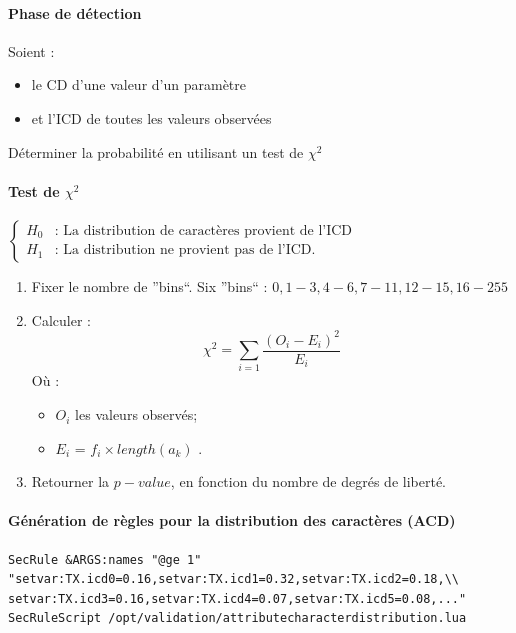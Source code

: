 \documentclass[a4paper,10pt,justified,openany]{tufte-book}
\begin{document}
 \paragraph{Phase de détection}
  Soient :
  \begin{itemize}
   \item le CD d'une valeur d'un paramètre
   \item et l'ICD de toutes les valeurs observées
  \end{itemize}
   Déterminer la probabilité en utilisant un test de $\chi^2$
 





 \paragraph{Test de  $\chi^2$}
  $\left\lbrace\begin{array}{ll}
    H_0&\textrm{: La distribution de caractères provient de l'ICD} \\
    H_1 &\textrm{: La distribution ne provient pas de l'ICD.}
   \end{array}\right.
    $

  \begin{enumerate}
   \item  Fixer le nombre de ''bins``.
    Six ''bins`` : $0, 1-3, 4-6, 7-11, 12-15, 16-255$
   \item Calculer : \begin{equation}
                     \chi^2 = \sum_{i=1}\frac{(O_i-E_i)^2}{E_i}
                    \end{equation}
     Où : 
     \begin{itemize}
      \item $O_i$ les valeurs observés;
      \item $E_i$ = $f_i\times length(a_k)$ . 
     \end{itemize}
   
   \item Retourner la $p-value$, en fonction du nombre de degrés de liberté.
  \end{enumerate}
 

\paragraph{\textbf{Génération de règles pour la distribution des caractères (ACD)}}

\begin{verbatim}
SecRule &ARGS:names "@ge 1" "setvar:TX.icd0=0.16,setvar:TX.icd1=0.32,setvar:TX.icd2=0.18,\\
setvar:TX.icd3=0.16,setvar:TX.icd4=0.07,setvar:TX.icd5=0.08,..." 
SecRuleScript /opt/validation/attributecharacterdistribution.lua
\end{verbatim}
\end{document}
